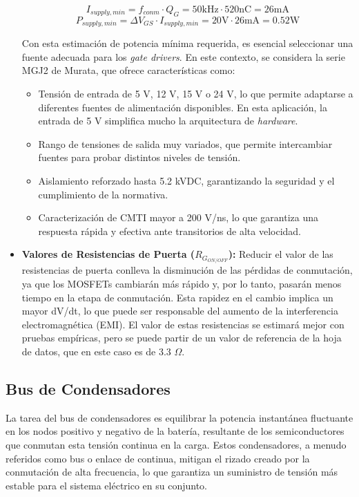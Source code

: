 \begin{itemize}
	\[
	I_{supply, min} = f_{conm}\cdot Q_G = 50 \text{kHz} \cdot 520 \text{nC} = 26 \text{mA}
	\]
	\[
	P_{supply, min} = \Delta V_{GS}\cdot I_{supply, min} = 20 \text{V} \cdot26 \text{mA} = 0.52 \text{W}
	\]
	
	Con esta estimación de potencia mínima requerida, es esencial seleccionar una fuente adecuada para los \textit{gate drivers}. En este contexto, se considera la serie MGJ2 de Murata, que ofrece características como:
	\begin{itemize}
		\item Tensión de entrada de 5 V, 12 V, 15 V o 24 V, lo que permite adaptarse a diferentes fuentes de alimentación disponibles. En esta aplicación, la entrada de 5 V simplifica mucho la arquitectura de \textit{hardware}.
		\item Rango de tensiones de salida muy variados, que permite intercambiar fuentes para probar distintos niveles de tensión.
		\item Aislamiento reforzado hasta 5.2 kVDC, garantizando la seguridad y el cumplimiento de la normativa.
		\item Caracterización de CMTI mayor a 200 V/ns, lo que garantiza una respuesta rápida y efectiva ante transitorios de alta velocidad.
	\end{itemize}
	
	\item \textbf{Valores de Resistencias de Puerta (\(R_{G_{ON/OFF}}\)):} Reducir el valor de las resistencias de puerta conlleva la disminución de las pérdidas de conmutación, ya que los MOSFETs cambiarán más rápido y, por lo tanto, pasarán menos tiempo en la etapa de conmutación. Esta rapidez en el cambio implica un mayor dV/dt, lo que puede ser responsable del aumento de la interferencia electromagnética (EMI). El valor de estas resistencias se estimará mejor con pruebas empíricas, pero se puede partir de un valor de referencia de la hoja de datos, que en este caso es de 3.3 $\Omega$.
	
\end{itemize}


\subsection{Bus de Condensadores}

La tarea del bus de condensadores es equilibrar la potencia instantánea fluctuante en los nodos positivo y negativo de la batería, resultante de los semiconductores que conmutan esta tensión continua en la carga. Estos condensadores, a menudo referidos como bus o enlace de continua, mitigan el rizado creado por la conmutación de alta frecuencia, lo que garantiza un suministro de tensión más estable para el sistema eléctrico en su conjunto.


